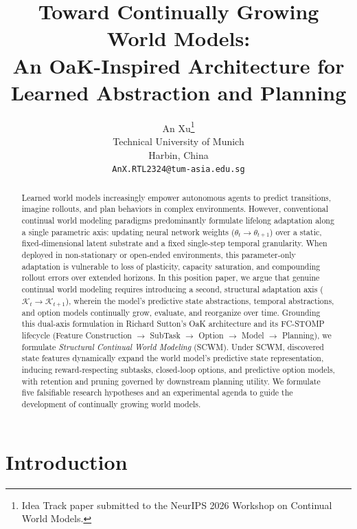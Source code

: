\documentclass{article}
\title{Toward Continually Growing World Models:\\An OaK-Inspired Architecture for Learned Abstraction and Planning}
\author{%
  An Xu\thanks{Idea Track paper submitted to the NeurIPS 2026 Workshop on Continual World Models.} \\
  Technical University of Munich \\
  Harbin, China \\
  \texttt{AnX.RTL2324@tum-asia.edu.sg} \\
}
\theoremstyle{definition}
\begin{document}
\maketitle

\begin{abstract}
Learned world models increasingly empower autonomous agents to predict transitions, imagine rollouts, and plan behaviors in complex environments. However, conventional continual world modeling paradigms predominantly formulate lifelong adaptation along a single parametric axis: updating neural network weights ($\theta_t \to \theta_{t+1}$) over a static, fixed-dimensional latent substrate and a fixed single-step temporal granularity. When deployed in non-stationary or open-ended environments, this parameter-only adaptation is vulnerable to loss of plasticity, capacity saturation, and compounding rollout errors over extended horizons. In this position paper, we argue that genuine continual world modeling requires introducing a second, structural adaptation axis ($\mathcal{K}_t \to \mathcal{K}_{t+1}$), wherein the model's predictive state abstractions, temporal abstractions, and option models continually grow, evaluate, and reorganize over time. Grounding this dual-axis formulation in Richard Sutton's OaK architecture and its \mbox{FC-STOMP} lifecycle (Feature Construction $\rightarrow$ SubTask $\rightarrow$ Option $\rightarrow$ Model $\rightarrow$ Planning), we formulate \emph{Structural Continual World Modeling} (SCWM). Under SCWM, discovered state features dynamically expand the world model's predictive state representation, inducing reward-respecting subtasks, closed-loop options, and predictive option models, with retention and pruning governed by downstream planning utility. We formulate five falsifiable research hypotheses and an experimental agenda to guide the development of continually growing world models.
\end{abstract}



\section{Introduction}
\label{sec:introduction}
\end{document}
